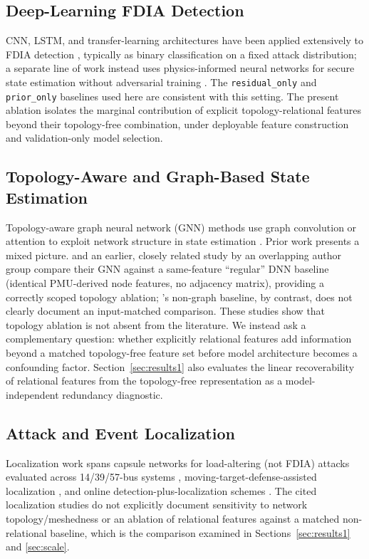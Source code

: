 \documentclass[conference]{IEEEtran}
\begin{document}
\subsection{Deep-Learning FDIA Detection}
CNN, LSTM, and transfer-learning architectures have been applied extensively to FDIA detection \cite{niu2018dynamic,li2021adversarial,xu2021detecting}, typically as binary classification on a fixed attack distribution; a separate line of work instead uses physics-informed neural networks for secure state estimation without adversarial training \cite{falas2026learning}. The \texttt{residual\_only} and \texttt{prior\_only} baselines used here are consistent with this setting. The present ablation isolates the marginal contribution of explicit topology-relational features beyond their topology-free combination, under deployable feature construction and validation-only model selection.

\subsection{Topology-Aware and Graph-Based State Estimation}
Topology-aware graph neural network (GNN) methods use graph convolution or attention to exploit network structure in state estimation \cite{moshtagh2025topology,moshtagh2022timesync,suri2025powergnn,yaniv2026robust}. Prior work presents a mixed picture. \cite{moshtagh2025topology} and an earlier, closely related study by an overlapping author group \cite{moshtagh2022timesync} compare their GNN against a same-feature ``regular'' DNN baseline (identical PMU-derived node features, no adjacency matrix), providing a correctly scoped topology ablation; \cite{suri2025powergnn}'s non-graph baseline, by contrast, does not clearly document an input-matched comparison. These studies show that topology ablation is not absent from the literature. We instead ask a complementary question: whether explicitly relational features add information beyond a matched topology-free feature set before model architecture becomes a confounding factor. Section~\ref{sec:results1} also evaluates the linear recoverability of relational features from the topology-free representation as a model-independent redundancy diagnostic.

\subsection{Attack and Event Localization}
Localization work spans capsule networks for load-altering (not FDIA) attacks evaluated across 14/39/57-bus systems \cite{jahangir2022localizing}, moving-target-defense-assisted localization \cite{chen2022localization}, and online detection-plus-localization schemes \cite{li2021online}. The cited localization studies do not explicitly document sensitivity to network topology/meshedness or an ablation of relational features against a matched non-relational baseline, which is the comparison examined in Sections~\ref{sec:results1} and \ref{sec:scale}.
\end{document}
